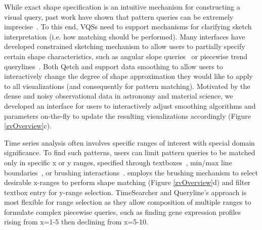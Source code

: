  While exact shape specification is an intuitive mechanism for constructing a visual query, past work have shown that pattern queries can be extremely imprecise~\cite{correll2016semantics,Holz2009,Eichmann2015}. To this end, VQSs need to support mechanisms for clarifying sketch interpretation (i.e. how matching should be performed). Many interfaces have developed constrained sketching mechanism to allow users to partially specify certain shape characteristics, such as angular slope queries~\cite{Hochheiser2004} or piecewise trend querylines~\cite{ryall2005querylines}. Both Qetch and \zv support data smoothing to allow users to interactively change the degree of shape approximation they would like to apply to all visualizations (and consequently for pattern matching). Motivated by the dense and noisy observational data in astronomy and material science, we developed an interface for users to interactively adjust smoothing algorithms and parameters on-the-fly to update the resulting visualizations accordingly (Figure \ref{zvOverview}c).
\par Time series analysis often involves specific ranges of interest with special domain significance. To find such patterns, users can limit pattern queries to be matched only in specific x or y ranges, specified through textboxes~\cite{wattenberg2001sketching,Mannino2018}, min/max line boundaries~\cite{ryall2005querylines}, or brushing interactions~\cite{Hochheiser2001}. \zv employs the brushing mechanism to select desirable x-ranges to perform shape matching (Figure \ref{zvOverview}d) and filter textbox entry for y-range selection. %
TimeSearcher and Queryline's approach is most flexible for range selection as they allow composition of multiple ranges to formulate complex piecewise queries, such as finding gene expression profiles rising from x=1-5 then declining from x=5-10.
